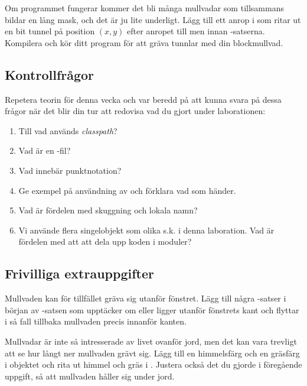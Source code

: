 \Subtask Om programmet fungerar kommer det bli många mullvadar som tillsammans bildar en lång mask, och det är ju lite underligt. Lägg till ett anrop i  som ritar ut en bit tunnel på position $(x, y)$ efter anropet till  men innan -satserna. Kompilera och kör ditt program för att gräva tunnlar med din blockmullvad.

\subsection{Kontrollfrågor}\Checkpoint

\noindent Repetera teorin för denna vecka och var beredd på att kunna svara på dessa frågor när det blir din tur att redovisa vad du gjort under laborationen:

\begin{enumerate}
\item Till vad används \emph{classpath}?
\item Vad är en -fil?
\item Vad innebär punktnotation?
\item Ge exempel på användning av  och förklara vad som händer.
\item Vad är fördelen med skuggning och lokala namn?
\item Vi använde flera singelobjekt som olika s.k.  i denna laboration. Vad är fördelen med att att dela upp koden i moduler?
\end{enumerate}




\clearpage

\subsection{Frivilliga extrauppgifter}

\Task
Mullvaden kan för tillfället gräva sig utanför fönstret.
Lägg till några -satser i början av -satsen som upptäcker om  eller  ligger utanför fönstrets kant och flyttar i så fall tillbaka mullvaden precis innanför kanten.

\Task
Mullvadar är inte så intresserade av livet ovanför jord, men det kan vara trevligt att se hur långt ner mullvaden grävt sig.
Lägg till en himmelsfärg och en gräsfärg i objektet  och rita ut himmel och gräs i .
Justera också det du gjorde i föregående uppgift, så att mullvaden håller sig under jord.

